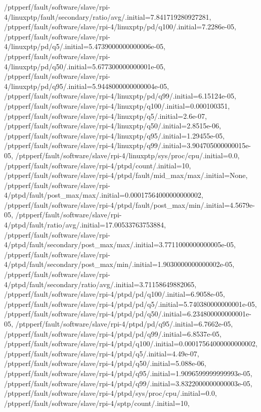 {    /ptpperf/fault/software/slave/rpi-4/linuxptp/fault/secondary/ratio/avg/.initial=7.841719280927281,
    /ptpperf/fault/software/slave/rpi-4/linuxptp/pd/q100/.initial=7.2286e-05,
    /ptpperf/fault/software/slave/rpi-4/linuxptp/pd/q5/.initial=5.4739000000000006e-05,
    /ptpperf/fault/software/slave/rpi-4/linuxptp/pd/q50/.initial=5.677300000000001e-05,
    /ptpperf/fault/software/slave/rpi-4/linuxptp/pd/q95/.initial=5.9448000000000004e-05,
    /ptpperf/fault/software/slave/rpi-4/linuxptp/pd/q99/.initial=6.15124e-05,
    /ptpperf/fault/software/slave/rpi-4/linuxptp/q100/.initial=0.000100351,
    /ptpperf/fault/software/slave/rpi-4/linuxptp/q5/.initial=2.6e-07,
    /ptpperf/fault/software/slave/rpi-4/linuxptp/q50/.initial=2.8515e-06,
    /ptpperf/fault/software/slave/rpi-4/linuxptp/q95/.initial=1.29455e-05,
    /ptpperf/fault/software/slave/rpi-4/linuxptp/q99/.initial=3.904705000000015e-05,
    /ptpperf/fault/software/slave/rpi-4/linuxptp/sys/proc/cpu/.initial=0.0,
    /ptpperf/fault/software/slave/rpi-4/ptpd/count/.initial=10,
    /ptpperf/fault/software/slave/rpi-4/ptpd/fault/mid_max/max/.initial=None,
    /ptpperf/fault/software/slave/rpi-4/ptpd/fault/post_max/max/.initial=0.00017564000000000002,
    /ptpperf/fault/software/slave/rpi-4/ptpd/fault/post_max/min/.initial=4.5679e-05,
    /ptpperf/fault/software/slave/rpi-4/ptpd/fault/ratio/avg/.initial=17.00533763753884,
    /ptpperf/fault/software/slave/rpi-4/ptpd/fault/secondary/post_max/max/.initial=3.7711000000000005e-05,
    /ptpperf/fault/software/slave/rpi-4/ptpd/fault/secondary/post_max/min/.initial=1.9030000000000002e-05,
    /ptpperf/fault/software/slave/rpi-4/ptpd/fault/secondary/ratio/avg/.initial=3.71158649882065,
    /ptpperf/fault/software/slave/rpi-4/ptpd/pd/q100/.initial=6.9058e-05,
    /ptpperf/fault/software/slave/rpi-4/ptpd/pd/q5/.initial=5.740380000000001e-05,
    /ptpperf/fault/software/slave/rpi-4/ptpd/pd/q50/.initial=6.234800000000001e-05,
    /ptpperf/fault/software/slave/rpi-4/ptpd/pd/q95/.initial=6.7662e-05,
    /ptpperf/fault/software/slave/rpi-4/ptpd/pd/q99/.initial=6.8537e-05,
    /ptpperf/fault/software/slave/rpi-4/ptpd/q100/.initial=0.00017564000000000002,
    /ptpperf/fault/software/slave/rpi-4/ptpd/q5/.initial=4.49e-07,
    /ptpperf/fault/software/slave/rpi-4/ptpd/q50/.initial=5.088e-06,
    /ptpperf/fault/software/slave/rpi-4/ptpd/q95/.initial=1.9096599999999993e-05,
    /ptpperf/fault/software/slave/rpi-4/ptpd/q99/.initial=3.8322000000000003e-05,
    /ptpperf/fault/software/slave/rpi-4/ptpd/sys/proc/cpu/.initial=0.0,
    /ptpperf/fault/software/slave/rpi-4/sptp/count/.initial=10,
}

